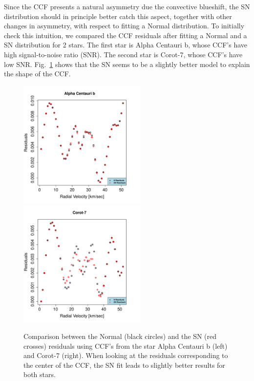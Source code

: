 \documentclass[11pt, oneside]{article}
\begin{document}
Since the CCF presents a natural asymmetry due the convective blueshift, the SN distribution should in principle better catch this aspect, together with other changes in asymmetry, with respect to fitting a Normal distribution. To initially check this intuition, we compared the CCF residuals after fitting a Normal and a SN distribution for 2 stars. The first star is Alpha Centauri b, whose CCF's have high signal-to-noise ratio (SNR). The second star is Corot-7, whose CCF's have low SNR. Fig.~\ref{fig:Residual.comparison} shows that the SN seems to be a slightly better model to explain the shape of the CCF.%
%
\begin{figure}[htbp]
   \centering
\includegraphics[height = 2.5in]{[1]HD128621Residuals.pdf} 
\includegraphics[height = 2.5in]{[1]LRa01_E2Residuals.pdf} 
   \caption{Comparison between the Normal (black circles) and the SN (red crosses) residuals using CCF's from the star Alpha Centauri b (left) and Corot-7 (right). When looking at the residuals corresponding to the center of the CCF, the SN fit leads to slightly better results for both stars.} %
    \label{fig:Residual.comparison}
\end{figure}
%
\end{document}
